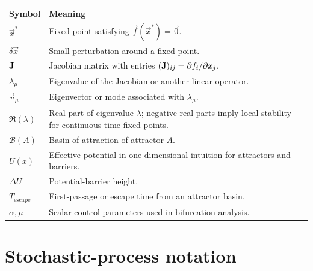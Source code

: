 \begin{tabularx}{\textwidth}{@{}p{}X@{}}
\toprule
\textbf{Symbol} & \textbf{Meaning} \\
\midrule
$\vec{x}^*$ & Fixed point satisfying $\vec{f}(\vec{x}^*)=\vec{0}$. \\
$\delta\vec{x}$ & Small perturbation around a fixed point. \\
$\mathbf{J}$ & Jacobian matrix with entries $(\mathbf{J})_{ij}=\partial f_i/\partial x_j$. \\
$\lambda_\mu$ & Eigenvalue of the Jacobian or another linear operator. \\
$\vec{v}_\mu$ & Eigenvector or mode associated with $\lambda_\mu$. \\
$\Re(\lambda)$ & Real part of eigenvalue $\lambda$; negative real parts imply local stability for continuous-time fixed points. \\
$\mathcal{B}(A)$ & Basin of attraction of attractor $A$. \\
$U(x)$ & Effective potential in one-dimensional intuition for attractors and barriers. \\
$\Delta U$ & Potential-barrier height. \\
$T_{\mathrm{escape}}$ & First-passage or escape time from an attractor basin. \\
$\alpha,\mu$ & Scalar control parameters used in bifurcation analysis. \\
\bottomrule
\end{tabularx}

\section{Stochastic-process notation}
\label{app:notation-stochastic}

